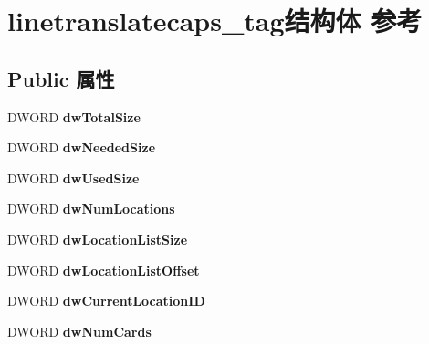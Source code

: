 \hypertarget{structlinetranslatecaps__tag}{}\section{linetranslatecaps\+\_\+tag结构体 参考}
\label{structlinetranslatecaps__tag}
\subsection*{Public 属性}
\begin{DoxyCompactItemize}
\item 
\mbox{\label{structlinetranslatecaps__tag_a9dae46b9a9ac113160334ae25b0f31e8}} 
D\+W\+O\+RD {\bfseries dw\+Total\+Size}
\item 
\mbox{\label{structlinetranslatecaps__tag_acedd51ea5f2000f52726f4b34b1ce3f7}} 
D\+W\+O\+RD {\bfseries dw\+Needed\+Size}
\item 
\mbox{\label{structlinetranslatecaps__tag_a55cc355e69f9bd6747c04456d30d3f75}} 
D\+W\+O\+RD {\bfseries dw\+Used\+Size}
\item 
\mbox{\label{structlinetranslatecaps__tag_a80e528ef28739dc2ba3775609a2576d4}} 
D\+W\+O\+RD {\bfseries dw\+Num\+Locations}
\item 
\mbox{\label{structlinetranslatecaps__tag_add0970b7c066254194933d56848e9fa3}} 
D\+W\+O\+RD {\bfseries dw\+Location\+List\+Size}
\item 
\mbox{\label{structlinetranslatecaps__tag_a40426ef617fcfd5c0b00a25771c63e8a}} 
D\+W\+O\+RD {\bfseries dw\+Location\+List\+Offset}
\item 
\mbox{\label{structlinetranslatecaps__tag_ab7451f11523c3dcfcbadf07bdc06ee8c}} 
D\+W\+O\+RD {\bfseries dw\+Current\+Location\+ID}
\item 
\mbox{\label{structlinetranslatecaps__tag_a94db962af60debb4c92f9803607e5def}} 
D\+W\+O\+RD {\bfseries dw\+Num\+Cards}
\item 

\end{DoxyCompactItemize}
